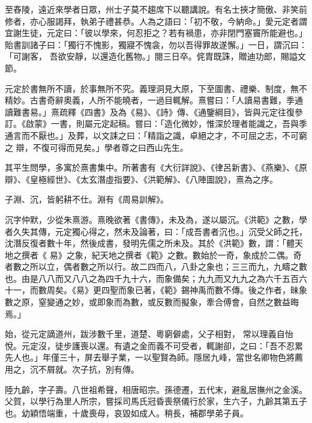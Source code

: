 \begin{pinyinscope}
 至舂陵，遠近來學者日眾，州士子莫不趨席下以聽講說。有名士挾才簡傲、非笑前修者，亦心服謁拜，執弟子禮甚恭。人為之語曰：「初不敬，今納命。」愛元定者謂宜謝生徒，元定曰：「彼以學來，何忍拒之？若有禍患，亦非閉門塞竇所能避也。」貽書訓諸子曰：「獨行不愧影，獨寢不愧衾，勿以吾得罪故遂懈。」一日，謂沉曰：「可謝客，
 吾欲安靜，以還造化舊物。」閱三日卒。侂胄既誅，贈迪功郎，賜謚文節。



 元定於書無所不讀，於事無所不究。義理洞見大原，下至圖書、禮樂、制度，無不精妙。古書奇辭奧義，人所不能曉者，一過目輒解。熹嘗曰：「人讀易書難，季通讀難書易。」熹疏釋《四書》及為《易》、《詩》傳、《通鑒綱目》，皆與元定往復參訂。《啟蒙》一書，則屬元定起稿。嘗曰：「造化微妙，惟深於理者能識之，吾與季通言而不厭也。」及葬，以文誄之曰：「精詣之識，卓絕之才，不可屈之志，不可窮之
 辯，不復可得而見矣。」學者尊之曰西山先生。



 其平生問學，多寓於熹書集中。所著書有《大衍詳說》、《律呂新書》、《燕樂》、《原辯》、《皇極經世》、《太玄潛虛指要》、《洪範解》、《八陣圖說》，熹為之序。



 子淵、沉，皆躬耕不仕。淵有《周易訓解》。



 沉字仲默，少從朱熹游。熹晚欲著《書傳》，未及為，遂以屬沉。《洪範》之數，學者久失其傳，元定獨心得之，然未及論著，曰：「成吾書者沉也。」沉受父師之托，沈潛反復者數十年，然後成書，發明先儒之所未及。其於《洪範》數，謂：「體天地之撰者《
 易》之象，紀天地之撰者《範》之數。數始於一奇，象成於二偶。奇者數之所以立，偶者數之所以行。故二四而八，八卦之象也；三三而九，九疇之數也。由是八八而又八八之為四千九十六，而象備矣；九九而又九九之為六千五百六十一，而數周矣。《易》更四聖而象已著，《範》錫神禹而數不傳。後之作者，昧象數之原，窒變通之妙，或即象而為數，或反數而擬象，牽合傅會，自然之數益晦焉。」



 始，從元定謫道州，跋涉數千里，道楚、粵窮僻處，父子相對，
 常以理義自怡悅。元定沒，徒步護喪以還。有遺之金而義不可受者，輒謝卻，之曰：「吾不忍累先人也。」年僅三十，屏去舉子業，一以聖賢為師。隱居九峰，當世名卿物色將薦用之，沉不屑就。次子抗，別有傳。



 陸九齡，字子壽。八世祖希聲，相唐昭宗。孫德遷，五代末，避亂居撫州之金溪。父賀，以學行為里人所宗，嘗採司馬氏冠昏喪祭儀行於家，生六子，九齡其第五子也。幼穎悟端重，十歲喪母，哀毀如成人。稍長，補郡學弟子員。




\end{pinyinscope}
